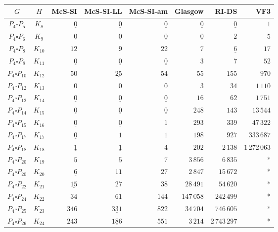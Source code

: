 
\begin{tabular}{ccrrrrrr}
    \toprule
    {$G$} & {$H$} & {McS-SI} & {McS-SI-LL} & {McS-SI-am} & Glasgow & RI-DS & VF3\\ 
    \midrule

$P_4\square P_{5}$ & $K_{8}$ & $\underline{0}$ & $\underline{0}$ & $\underline{0}$ & $\underline{0}$ & $\underline{0}$ & $1$\\
$P_4\square P_{6}$ & $K_{9}$ & $\underline{0}$ & $\underline{0}$ & $\underline{0}$ & $\underline{0}$ & $2$ & $5$\\
$P_4\square P_{8}$ & $K_{10}$ & $12$ & $9$ & $22$ & $7$ & $\underline{6}$ & $17$\\
$P_4\square P_{8}$ & $K_{11}$ & $\underline{0}$ & $\underline{0}$ & $\underline{0}$ & $3$ & $7$ & $52$\\
$P_4\square P_{10}$ & $K_{12}$ & $50$ & $\underline{25}$ & $54$ & $55$ & $155$ & $970$\\
$P_4\square P_{12}$ & $K_{13}$ & $\underline{0}$ & $\underline{0}$ & $\underline{0}$ & $3$ & $34$ & $1\,110$\\
$P_4\square P_{12}$ & $K_{14}$ & $\underline{0}$ & $\underline{0}$ & $\underline{0}$ & $16$ & $62$ & $1\,751$\\
$P_4\square P_{14}$ & $K_{15}$ & $\underline{0}$ & $\underline{0}$ & $\underline{0}$ & $248$ & $143$ & $13\,544$\\
$P_4\square P_{15}$ & $K_{16}$ & $\underline{0}$ & $\underline{0}$ & $1$ & $293$ & $339$ & $47\,322$\\
$P_4\square P_{17}$ & $K_{17}$ & $\underline{0}$ & $1$ & $1$ & $198$ & $927$ & $333\,687$\\
$P_4\square P_{18}$ & $K_{18}$ & $\underline{1}$ & $\underline{1}$ & $4$ & $202$ & $2\,138$ & $1\,272\,063$\\
$P_4\square P_{20}$ & $K_{19}$ & $\underline{5}$ & $\underline{5}$ & $7$ & $3\,856$ & $6\,835$ & *\\
$P_4\square P_{20}$ & $K_{20}$ & $\underline{6}$ & $11$ & $27$ & $2\,847$ & $15\,672$ & *\\
$P_4\square P_{22}$ & $K_{21}$ & $\underline{15}$ & $27$ & $38$ & $28\,491$ & $54\,620$ & *\\
$P_4\square P_{24}$ & $K_{22}$ & $\underline{34}$ & $61$ & $144$ & $147\,058$ & $242\,499$ & *\\
$P_4\square P_{25}$ & $K_{23}$ & $346$ & $\underline{331}$ & $822$ & $34\,704$ & $746\,605$ & *\\
$P_4\square P_{26}$ & $K_{24}$ & $243$ & $\underline{186}$ & $551$ & $3\,214$ & $2\,743\,297$ & *\\

\end{tabular}
